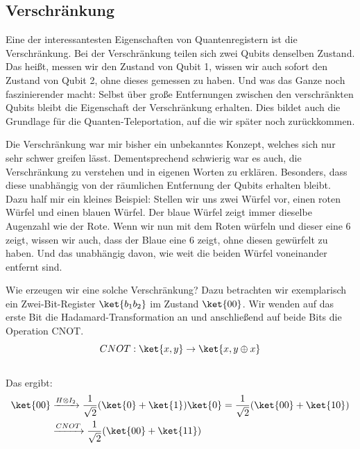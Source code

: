 \subsection{Verschränkung}
\label{subsec:verschraenkung}

Eine der interessantesten Eigenschaften von Quantenregistern ist die Verschränkung.
Bei der Verschränkung teilen sich zwei Qubits denselben Zustand.
Das heißt, messen wir den Zustand von Qubit 1, wissen wir auch sofort den Zustand von Qubit 2, ohne dieses gemessen zu haben.
Und was das Ganze noch faszinierender macht: Selbst über große Entfernungen zwischen den verschränkten Qubits bleibt die Eigenschaft der Verschränkung erhalten.
Dies bildet auch die Grundlage für die Quanten-Teleportation, auf die wir später noch zurückkommen.\\

\begin{tcolorbox}[title=Kommentar,
    title filled=false,
    colback=cyan!5!white,
    colframe=cyan!75!black]
    Die Verschränkung war mir bisher ein unbekanntes Konzept, welches sich nur sehr schwer greifen lässt.
    Dementsprechend schwierig war es auch, die Verschränkung zu verstehen und in eigenen Worten zu erklären.
    Besonders, dass diese unabhängig von der räumlichen Entfernung der Qubits erhalten bleibt.\\

    Dazu half mir ein kleines Beispiel: Stellen wir uns zwei Würfel vor, einen roten Würfel und einen blauen Würfel.
    Der blaue Würfel zeigt immer dieselbe Augenzahl wie der Rote.
    Wenn wir nun mit dem Roten würfeln und dieser eine 6 zeigt, wissen wir auch, dass der Blaue eine 6 zeigt, ohne diesen gewürfelt zu haben.
    Und das unabhängig davon, wie weit die beiden Würfel voneinander entfernt sind.
\end{tcolorbox}

Wie erzeugen wir eine solche Verschränkung?
Dazu betrachten wir exemplarisch ein Zwei-Bit-Register $\ket{b_{1}b_{2}}$ im Zustand $\ket{00}$.
Wir wenden auf das erste Bit die Hadamard-Transformation an und anschließend auf beide Bits die Operation CNOT\@.\\
\begin{equation}
    CNOT : \ket{x,y} \rightarrow \ket{x,y\oplus x}
\end{equation}\\

Das ergibt:\\
\begin{align}
    \ket{00} &\xrightarrow{H\otimes I_{2}} \frac{1}{\sqrt{2}}(\ket{0}+\ket{1})\ket{0} = \frac{1}{\sqrt{2}}(\ket{00}+\ket{10}) \\
    &\xrightarrow{CNOT} \frac{1}{\sqrt{2}}(\ket{00}+\ket{11})
\end{align}\\

